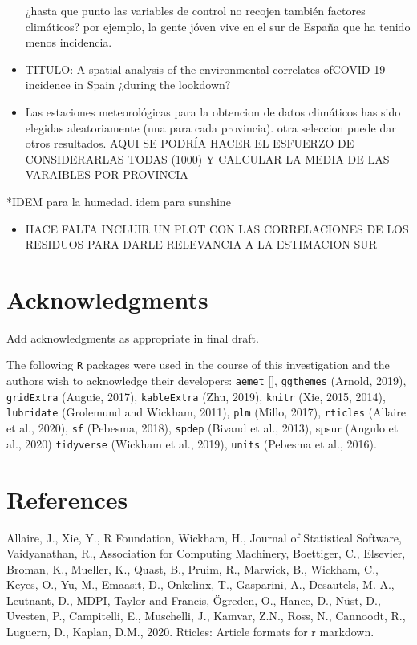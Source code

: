 \documentclass[]{elsarticle} %
\providecommand{\tightlist}{%
  \setlength{\itemsep}{0pt}\setlength{\parskip}{0pt}}
\begin{document}
\begin{itemize}
  ¿hasta que punto las variables de control no recojen también factores
  climáticos? por ejemplo, la gente jóven vive en el sur de España que
  ha tenido menos incidencia.
\item
  TITULO: A spatial analysis of the environmental correlates ofCOVID-19
  incidence in Spain ¿during the lookdown?
\item
  Las estaciones meteorológicas para la obtencion de datos climáticos
  has sido elegidas aleatoriamente (una para cada provincia). otra
  seleccion puede dar otros resultados. AQUI SE PODRÍA HACER EL ESFUERZO
  DE CONSIDERARLAS TODAS (1000) Y CALCULAR LA MEDIA DE LAS VARAIBLES POR
  PROVINCIA
\end{itemize}

*IDEM para la humedad. idem para sunshine

\begin{itemize}
\tightlist
\item
  HACE FALTA INCLUIR UN PLOT CON LAS CORRELACIONES DE LOS RESIDUOS PARA
  DARLE RELEVANCIA A LA ESTIMACION SUR
\end{itemize}

\hypertarget{acknowledgments}{%
\section*{Acknowledgments}\label{acknowledgments}}

Add acknowledgments as appropriate in final draft.

The following \texttt{R} packages were used in the course of this
investigation and the authors wish to acknowledge their developers:
\texttt{aemet} {[}{]}, \texttt{ggthemes} (Arnold, 2019),
\texttt{gridExtra} (Auguie, 2017), \texttt{kableExtra} (Zhu, 2019),
\texttt{knitr} (Xie, 2015, 2014), \texttt{lubridate} (Grolemund and
Wickham, 2011), \texttt{plm} (Millo, 2017), \texttt{rticles} (Allaire et
al., 2020), \texttt{sf} (Pebesma, 2018), \texttt{spdep} (Bivand et al.,
2013), spsur (Angulo et al., 2020) \texttt{tidyverse} (Wickham et al.,
2019), \texttt{units} (Pebesma et al., 2016).

\hypertarget{references}{%
\section*{References}\label{references}}

\hypertarget{refs}{}
\leavevmode\hypertarget{ref-Allaire2020}{}%
Allaire, J., Xie, Y., R Foundation, Wickham, H., Journal of Statistical
Software, Vaidyanathan, R., Association for Computing Machinery,
Boettiger, C., Elsevier, Broman, K., Mueller, K., Quast, B., Pruim, R.,
Marwick, B., Wickham, C., Keyes, O., Yu, M., Emaasit, D., Onkelinx, T.,
Gasparini, A., Desautels, M.-A., Leutnant, D., MDPI, Taylor and Francis,
Ögreden, O., Hance, D., Nüst, D., Uvesten, P., Campitelli, E.,
Muschelli, J., Kamvar, Z.N., Ross, N., Cannoodt, R., Luguern, D.,
Kaplan, D.M., 2020. Rticles: Article formats for r markdown.
\end{document}
